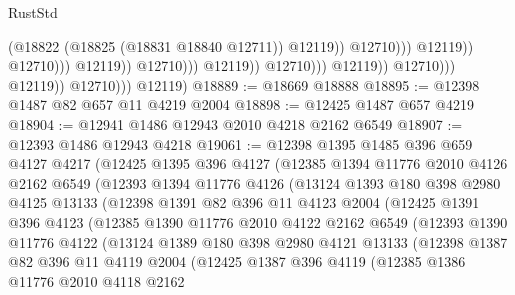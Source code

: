 \begin{lexlean}{RustStd}
\begin{coremodule}
                                                                (@18822
                                                                  (@18825 (@18831 @18840 @12711))
                                                                  @12119))
                                                              @12710)))
                                                        @12119))
                                                    @12710)))
                                              @12119))
                                          @12710)))
                                    @12119))
                                @12710)))
                          @12119))
                      @12710)))
                @12119))
            @12710)))
      @12119)
@18889 := @18669 @18888
@18895 := @12398 @1487 @82 @657 @11 @4219 @2004
@18898 := @12425 @1487 @657 @4219
@18904 := @12941 @1486 @12943 @2010 @4218 @2162 @6549
@18907 := @12393 @1486 @12943 @4218
@19061 := @12398
    @1395
    @1485
    @396
    @659
    @4127
    @4217
    (@12425
      @1395
      @396
      @4127
      (@12385
        @1394
        @11776
        @2010
        @4126
        @2162
        @6549
        (@12393
          @1394
          @11776
          @4126
          (@13124
            @1393
            @180
            @398
            @2980
            @4125
            @13133
            (@12398
              @1391
              @82
              @396
              @11
              @4123
              @2004
              (@12425
                @1391
                @396
                @4123
                (@12385
                  @1390
                  @11776
                  @2010
                  @4122
                  @2162
                  @6549
                  (@12393
                    @1390
                    @11776
                    @4122
                    (@13124
                      @1389
                      @180
                      @398
                      @2980
                      @4121
                      @13133
                      (@12398
                        @1387
                        @82
                        @396
                        @11
                        @4119
                        @2004
                        (@12425
                          @1387
                          @396
                          @4119
                          (@12385
                            @1386
                            @11776
                            @2010
                            @4118
                            @2162

\end{coremodule}
\end{lexlean}

